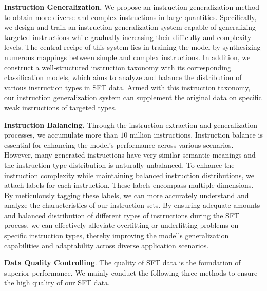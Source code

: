 \documentclass{article}
\begin{document}
\textbf{Instruction Generalization.}
We propose an instruction generalization method to obtain more diverse and complex instructions in large quantities.
Specifically, we design and train an instruction generalization system capable of generalizing targeted instructions while gradually increasing their difficulty and complexity levels. The central recipe of this system lies in training the model by synthesizing numerous mappings between simple and complex instructions.
In addition, we construct a well-structured instruction taxonomy with its corresponding classification models, which aims to analyze and balance the distribution of various instruction types in SFT data. Armed with this instruction taxonomy, our instruction generalization system can supplement the original data on specific weak instructions of targeted types.

\textbf{Instruction Balancing.}
Through the instruction extraction and generalization processes, we accumulate more than $10$ million instructions. Instruction balance is essential for enhancing the model's performance across various scenarios. However, many generated instructions have very similar semantic meanings and the instruction type distribution is naturally unbalanced.
To enhance the instruction complexity while maintaining balanced instruction distributions, we attach labels for each instruction. These labels encompass multiple dimensions. By meticulously tagging these labels, we can more accurately understand and analyze the characteristics of our instruction sets. 
By ensuring adequate amounts and balanced distribution of different types of instructions during the SFT process, we can effectively alleviate overfitting or underfitting problems on specific instruction types, thereby improving the model's generalization capabilities and adaptability across diverse application scenarios.

\textbf{Data Quality Controlling}.
The quality of SFT data is the foundation of superior performance. We mainly conduct the following three methods to ensure the high quality of our SFT data.
\end{document}
